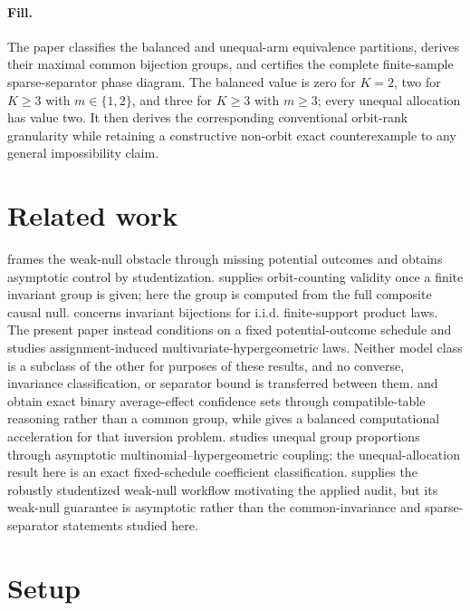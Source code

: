 \documentclass{article}
\begin{document}
\paragraph{Fill.} The paper classifies the balanced and unequal-arm equivalence partitions, derives their maximal common bijection groups, and certifies the complete finite-sample sparse-separator phase diagram. The balanced value is zero for \(K=2\), two for \(K\geq3\) with \(m\in\{1,2\}\), and three for \(K\geq3\) with \(m\geq3\); every unequal allocation has value two. It then derives the corresponding conventional orbit-rank granularity while retaining a constructive non-orbit exact counterexample to any general impossibility claim.

\section{Related work}

\cite{WuDing2021} frames the weak-null obstacle through missing potential outcomes and obtains asymptotic control by studentization. \cite{HemerikGoeman2018} supplies orbit-counting validity once a finite invariant group is given; here the group is computed from the full composite causal null. \cite{DutzZhang2026} concerns invariant bijections for i.i.d. finite-support product laws. The present paper instead conditions on a fixed potential-outcome schedule and studies assignment-induced multivariate-hypergeometric laws. Neither model class is a subclass of the other for purposes of these results, and no converse, invariance classification, or separator bound is transferred between them. \cite{RigdonHudgens2015} and \cite{LiDing2016} obtain exact binary average-effect confidence sets through compatible-table reasoning rather than a common group, while \cite{AronowChangLopatto2025} gives a balanced computational acceleration for that inversion problem. \cite{ChungRomano2013} studies unequal group proportions through asymptotic multinomial--hypergeometric coupling; the unequal-allocation result here is an exact fixed-schedule coefficient classification. \cite{ZhaoDing2021} supplies the robustly studentized weak-null workflow motivating the applied audit, but its weak-null guarantee is asymptotic rather than the common-invariance and sparse-separator statements studied here.

\section{Setup}
\end{document}
